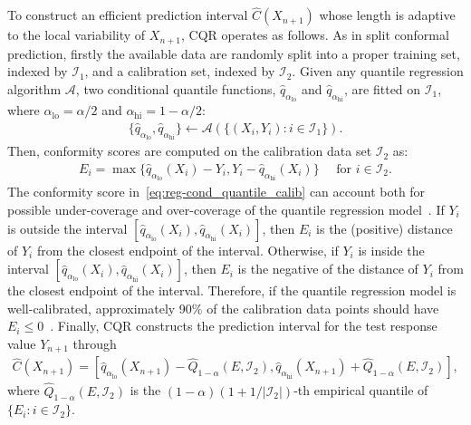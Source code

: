 To construct an efficient prediction interval $\hat{C}(X_{n+1})$ whose length is adaptive to the local variability of $X_{n+1}$, CQR operates as follows.
As in split conformal prediction, firstly the available data are randomly split into a proper training set, indexed by $\mathcal{I}_1$, and a calibration set, indexed by $\mathcal{I}_2$. Given any quantile regression algorithm $\mathcal{A}$, two conditional quantile functions, $\hat{q}_{\alpha_{\text{lo}}}$ and $\hat{q}_{\alpha_{\text{hi}}}$, are fitted on $\mathcal{I}_1$, where $\alpha_{\text{lo}} = \alpha/2$ and $\alpha_{\text{hi}} = 1-\alpha/2$: 
\begin{align} \label{eq:reg-cond_quantile_fit}
    \{ \hat{q}_{\alpha_{\text{lo}}}, \hat{q}_{\alpha_{\text{hi}}} \} \leftarrow \mathcal{A}(\{ (X_i, Y_i): i \in \mathcal{I}_1 \}).
\end{align}
Then, conformity scores are computed on the calibration data set $\mathcal{I}_2$ as:
\begin{align} \label{eq:reg-cond_quantile_calib}
    E_i = \max \{ \hat{q}_{\alpha_{\text{lo}}}(X_i) - Y_i, Y_i - \hat{q}_{\alpha_{\text{hi}}}(X_i) \} \quad \text{ for } i \in \mathcal{I}_2.
\end{align}
The conformity score in~\eqref{eq:reg-cond_quantile_calib} can account both for possible under-coverage and over-coverage of the quantile regression model~\cite{romano2019conformalized}. If $Y_i$ is outside the interval $[\hat{q}_{\alpha_{\text{lo}}}(X_i), \hat{q}_{\alpha_{\text{hi}}}(X_i)]$, then $E_i$ is the (positive) distance of $Y_i$ from the closest endpoint of the interval.
Otherwise, if $Y_i$ is inside the interval $[\hat{q}_{\alpha_{\text{lo}}}(X_i), \hat{q}_{\alpha_{\text{hi}}}(X_i)]$, then $E_i$ is the negative of the distance of $Y_i$ from the closest endpoint of the interval.
Therefore, if the quantile regression model is well-calibrated, approximately 90\% of the calibration data points should have $E_i \leq 0$~\cite{romano2019conformalized}.
Finally, CQR constructs the prediction interval for the test response value $Y_{n+1}$ through
\begin{align} \label{eq:reg-cond_quantile_construct_pi}
    \hat{C}(X_{n+1}) = [ \hat{q}_{\alpha_{\text{lo}}}(X_{n+1}) - \hat{Q}_{1-\alpha}(E, \mathcal{I}_2), \hat{q}_{\alpha_{\text{hi}}}(X_{n+1}) + \hat{Q}_{1-\alpha}(E, \mathcal{I}_2)    ],
\end{align}
where $\hat{Q}_{1-\alpha}(E, \mathcal{I}_2)$ is the $(1-\alpha)(1+1/|\mathcal{I}_2|)$-th empirical quantile of $\{E_i: i\in \mathcal{I}_2\}$.



